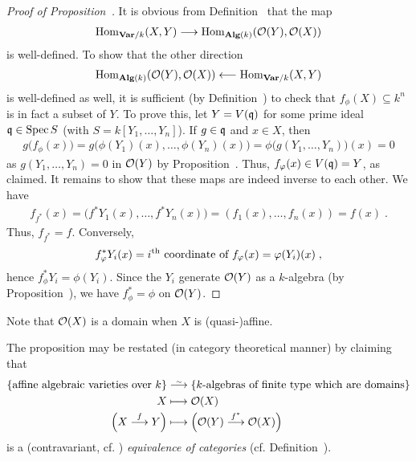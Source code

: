 \documentclass[a4paper,parskip=half,numbers=enddot, DIV=12]{scrreprt}
\begin{document}
	\begin{proof}[Proof of Proposition~]
		It is obvious from Definition~ that the map 
		\begin{align*}
			\Hom_{\cat{Var}/k}(X,Y)\morphism \Hom_{\cat{Alg}(k)}(\Oo(Y),\Oo(X))
		\end{align*}
		 is well-defined. To show that the other direction 
		 \begin{align*}
		 	\Hom_{\cat{Alg}(k)}(\Oo(Y),\Oo(X))\lmorphism\Hom_{\cat{Var}/k}(X,Y)
		 \end{align*}
		 is well-defined as well, it is sufficient (by Definition~) to check that $f_\phi(X)\subseteq k^n$ is in fact a subset of $Y$. To prove this, let $Y=V(\mathfrak{q})$ for some prime ideal $\mathfrak{q}\in\operatorname{Spec} S$ (with $S=k[Y_1,\ldots,Y_n]$). If $g\in\mathfrak{q}$ and $x\in X$, then
		\begin{align*}
			g\big(f_\phi(x)\big)=g\big(\phi(Y_1)(x),\ldots,\phi(Y_n)(x)\big)=\phi\big(g(Y_1,\ldots,Y_n)\big)(x)=0
		\end{align*}
		as $g(Y_1,\ldots,Y_n)=0$ in $\mathcal{O}(Y)$ by Proposition~. Thus, $f_\varphi(x)\in V(\mathfrak{q})=Y$, as claimed.
		It remains to show that these maps are indeed inverse to each other. We have
		\begin{align*}
			f_{f^*}(x)=\big(f^*Y_1(x),\ldots,f^*Y_n(x)\big)=\left(f_1(x),\ldots,f_n(x)\right)=f(x)\;.
		\end{align*}
		Thus, $f_{f^*}=f$. Conversely,
		\begin{align*}
			f_\varphi^*Y_i(x)=i^{\text{th}}\text{ coordinate of }f_\varphi(x)=\varphi(Y_i)(x)\;,
		\end{align*}
		hence $f_\phi^*Y_i=\phi(Y_i)$. Since the $Y_i$ generate $\mathcal{O}(Y)$ as a $k$-algebra (by Proposition~), we have $f_\phi^*=\phi$ on $\mathcal{O}(Y)$.
	\end{proof}
	\begin{rem*}
		\begin{alphanumerate}
			\item Note that $\mathcal{O}(X)$ is a domain when $X$ is (quasi-)affine.
			\item The proposition may be restated (in category theoretical manner) by claiming that
			\begin{align*}
				\left\{\text{affine algebraic varieties}\text{ over }k\right\}&\isomorphism\left\{k\text{-algebras of finite type which are domains}\right\}\\
				X&\longmapsto \Oo(X)\\
				\Big(X\morphism[f]Y\Big)&\longmapsto \Big(\Oo(Y)\morphism[f^*]\Oo(X)\Big)
			\end{align*}
			is a (contravariant, cf. ) \emph{equivalence of categories} (cf. Definition~).
		\end{alphanumerate}
	\end{rem*}
\end{document}
